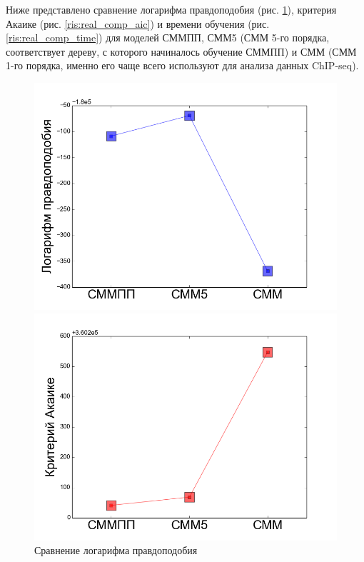 \documentclass{matmex-diploma-custom}
\begin{document}
Ниже представлено сравнение логарифма правдоподобия (рис. \ref{ris:real_comp_log_p}), критерия Акаике (рис. \ref{ris:real_comp_aic}) и времени обучения (рис. \ref{ris:real_comp_time}) для моделей СММПП, СММ5 (СММ 5-го порядка, соответствует дереву, с которого начиналось обучение СММПП) и СММ (СММ 1-го порядка, именно его чаще всего используют для анализа данных ChIP-seq).
\begin{figure}[h!]\centering
\begin{minipage}[b]{0.32 \textwidth}
	\includegraphics[scale=0.28]{img/real/log_p.png}
	\centering
	\caption{ Сравнение логарифма правдоподобия}
	\label{ris:real_comp_log_p}
\end{minipage}
\hfill
\begin{minipage}[b]{0.32 \textwidth}
	\includegraphics[scale=0.28]{img/real/aic.png}

\end{minipage}
\end{figure}
\end{document}

